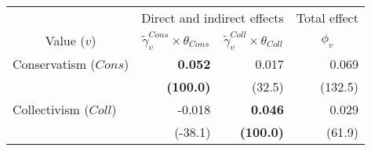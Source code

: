 
\begin{tabular}{lrrr}
\toprule
\multicolumn{1}{c}{ } & \multicolumn{2}{c}{Direct and indirect effects} & \multicolumn{1}{c}{Total effect} \\
\cmidrule(l{3pt}r{3pt}){2-3} \cmidrule(l{3pt}r{3pt}){4-4}
\multicolumn{1}{c}{Value ($v$)} & \multicolumn{1}{c}{$\widetilde{\gamma}^{Cons}_v \times \theta_{Cons}$} & \multicolumn{1}{c}{$\widetilde{\gamma}^{Coll}_v \times \theta_{Coll}$} & \multicolumn{1}{c}{${\phi}_v$}\\
\midrule
Conservatism ($Cons$) & \textbf{0.052} & 0.017 & 0.069\\
 & \textbf{(100.0)} & (32.5) & (132.5)\\
Collectivism ($Coll$) & -0.018 & \textbf{0.046} & 0.029\\
 & (-38.1) & \textbf{(100.0)} & (61.9)\\
\bottomrule
\end{tabular}
